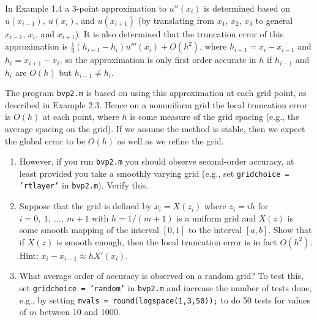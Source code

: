 

In Example 1.4 a 3-point approximation to $u''(x_i)$ is determined based on
$u(x_{i-1}),~ u(x_i)$, and $u(x_{i+1})$ (by translating from $x_1$, $x_2$,
$x_3$ to general $x_{i-1}$, $x_i$, and $x_{i+1}$).  
It is also determined that the truncation
error of this approximation is $\frac 1 3 (h_{i-1}-h_i) u'''(x_i) + O(h^2)$,
where $h_{i-1} = x_i-x_{i-1}$ and $h_i = x_{i+1}-x_i$, so the approximation is
only first order accurate in $h$ if $h_{i-1}$ and $h_i$ are  $O(h)$ but
$h_{i-1}\neq h_i$.  

The program {\tt bvp2.m} is based on using 
this approximation at each grid point, as described in Example 2.3.  
Hence on a nonuniform grid the local
truncation error is $O(h)$ at each point, where $h$ is some measure of the
grid spacing (e.g., the average spacing on the grid).  If we
assume the method is stable, then we expect the global error to be $O(h)$ as
well as we refine the grid.

\begin{enumerate}
\item
However, if you run {\tt bvp2.m} you should observe second-order
accuracy, at least provided you take a smoothly varying grid (e.g., set
{\tt gridchoice = 'rtlayer'} in {\tt bvp2.m}).  Verify this.

\item
Suppose that the grid is defined by $x_i = X(z_i)$ where $z_i = ih$ for
$i=0,~1,~\ldots,~m+1$ with $h=1/(m+1)$
is a uniform grid and $X(z)$ is some smooth mapping
of the interval $[0,1]$ to the interval $[a,b]$.  Show that if $X(z)$ is
smooth enough, then the local truncation error is in fact $O(h^2)$.
Hint: $x_i-x_{i-1} \approx hX'(x_i)$.

\item
What average order of accuracy is observed on a random grid?  To test this,
set {\tt gridchoice = 'random'} in {\tt bvp2.m} and increase the number of
tests done, e.g., by setting {\tt mvals = round(logspace(1,3,50));}
to do 50 tests for values of $m$ between 10 and 1000.
\end{enumerate}

